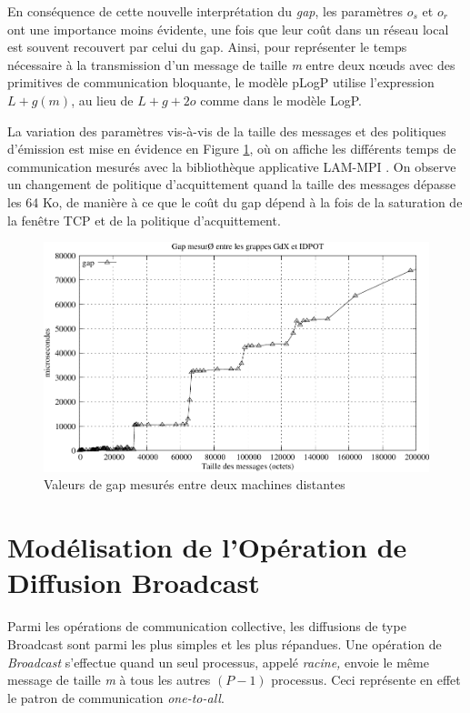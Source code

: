 En conséquence de cette nouvelle interprétation du \emph{gap}, les
paramètres $o_{s}$ et $o_{r}$ ont une importance moins évidente,
une fois que leur coût dans un réseau local est souvent recouvert
par celui du gap.  Ainsi, pour représenter le temps nécessaire à la transmission d'un
message de taille \emph{m} entre deux n{\oe}uds avec des primitives de
communication bloquante, le modèle pLogP utilise l'expression $L+g(m)$,
au lieu de $L+g+2o$ comme dans le modèle LogP. 


La variation des paramètres vis-à-vis de la taille des messages et des politiques d'émission est mise en évidence en Figure \ref{Figure: logp x hockney}, où on affiche les différents temps de communication mesurés avec la bibliothèque applicative LAM-MPI \cite{LAM04}. On observe un
changement de politique d'acquittement quand la taille des messages dépasse les 64 Ko, de manière à ce que le coût du gap dépend à la fois
de la saturation de la fenêtre TCP et de la politique d'acquittement.

%
\begin{figure}
\centering
\includegraphics[width=0.7\linewidth]{images/p2p/hockney-logp1}

\caption{\label{Figure: logp x hockney}Valeurs de gap mesurés entre deux machines
distantes}

\end{figure}



\section{Modélisation de l'Opération de Diffusion Broadcast}

Parmi les opérations de communication collective, les diffusions de type Broadcast sont parmi les plus simples et les plus répandues. Une opération de \emph{Broadcast} s'effectue quand un seul processus,
appelé \emph{racine,} envoie le même message de taille \emph{m} à
tous les autres $(P-1)$ processus.  Ceci représente en effet le patron de communication \textit{one-to-all}. 

